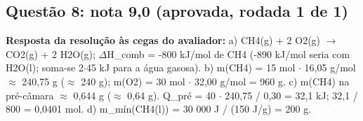 \documentclass{article}%
\begin{document}
\subsection*{Questão 8: nota 9,0 (aprovada, rodada 1 de 1)}%
\textbf{Resposta da resolução às cegas do avaliador:} a) CH4(g) + 2 O2(g) $\to$ CO2(g) + 2 H2O(g); $\Delta$H\_comb = -800 kJ/mol de CH4 (-890 kJ/mol seria com H2O(l); soma{-}se 2$\cdot$45 kJ para a água gasosa).\newline%
b) m(CH4) = 15 mol $\cdot$ 16,05 g/mol $\approx$ 240,75 g ($\approx$ 240 g); m(O2) = 30 mol $\cdot$ 32,00 g/mol = 960 g.\newline%
c) m(CH4) na pré{-}câmara $\approx$ 0,644 g ($\approx$ 0,64 g). Q\_pré = 40 $\cdot$ 240,75 / 0,30 = 32,1 kJ; 32,1 / 800 = 0,0401 mol.\newline%
d) m\_mín(CH4(l)) = 30 000 J / (150 J/g) = 200 g.\par %
\end{document}
